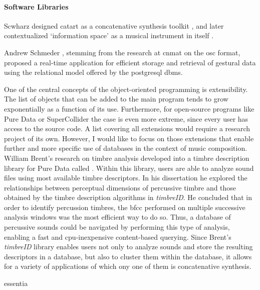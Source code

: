 {	\paragraph{Software Libraries}

	Scwharz designed \gls{catart} as a concatenative synthesis toolkit \parencite{Sch06:Rea}, and later contextualized `information space' as a musical instrument in itself \parencite{diemo_schwarz_2009_849679, Schwarz:2012}.

	Andrew Schmeder \parencite{icmc/bbp2372.2009.005}, stemming from the research at \gls{cnmat} on the \gls{osc} format, proposed a real-time application for efficient storage and retrieval of gestural data using the relational model offered by the \gls{postgresql} \gls{dbms}. 

	One of the central concepts of the object-oriented programming is extensibility. The list of objects that can be added to the main program tends to grow exponentially as a function of its use. Furthermore, for open-source programs like Pure Data or SuperCollider the case is even more extreme, since every user has access to the source code. A list covering all extensions would require a research project of its own. However, I would like to focus on those extensions that enable further and more specific use of databases in the context of music composition. William Brent's research on timbre analysis \parencite{Brent/2010/phdthesis} developed into a timbre description library for Pure Data called \parencite{icmc/bbp2372.2010.044}. Within this library, users are able to analyze sound files using most available timbre descriptors. In his dissertation he explored the relationships between perceptual dimensions of percussive timbre and those obtained by the timbre description algorithms in \textit{timbreID}. He concluded that in order to identify percussion timbres, the \gls{bfcc} performed on multiple successive analysis windows was the most efficient way to do so. Thus, a database of percussive sounds could be navigated by performing this type of analysis, enabling a fast and \gls{cpu}-inexpensive content-based querying. Since Brent's \textit{timbreID} library enables users not only to analyze sounds and store the resulting descriptors in a database, but also to cluster them within the database, it allows for a variety of applications of which ony one of them is concatenative synthesis.

	\gls{essentia} \parencite{DBLP:conf/ismir/BogdanovWGGHMRSZS13}
}
